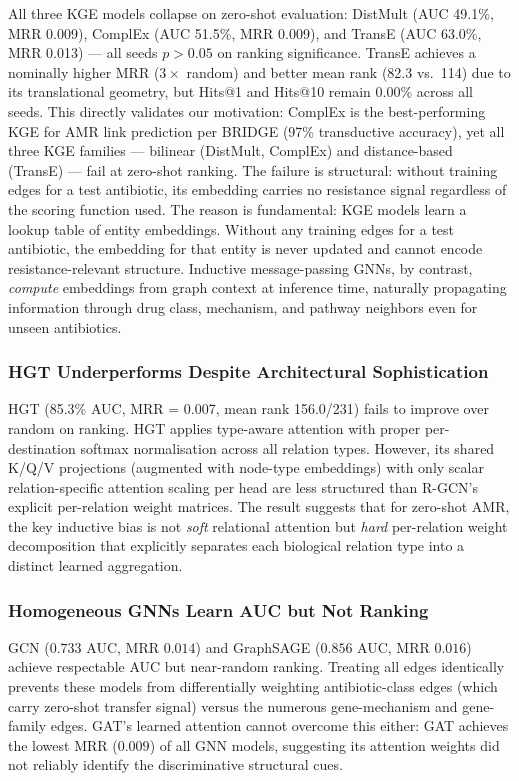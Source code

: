 \documentclass[conference]{IEEEtran}
\begin{document}
All three KGE models collapse on zero-shot evaluation: DistMult (AUC 49.1\%, MRR 0.009), ComplEx (AUC 51.5\%, MRR 0.009), and TransE (AUC 63.0\%, MRR 0.013) --- all seeds $p > 0.05$ on ranking significance. TransE achieves a nominally higher MRR ($3\times$ random) and better mean rank (82.3 vs.\ 114) due to its translational geometry, but Hits@1 and Hits@10 remain 0.00\% across all seeds. This directly validates our motivation: ComplEx is the best-performing KGE for AMR link prediction per BRIDGE \cite{bessadok2026bridge} (97\% transductive accuracy), yet all three KGE families --- bilinear (DistMult, ComplEx) and distance-based (TransE) --- fail at zero-shot ranking. The failure is structural: without training edges for a test antibiotic, its embedding carries no resistance signal regardless of the scoring function used. The reason is fundamental: KGE models learn a lookup table of entity embeddings. Without any training edges for a test antibiotic, the embedding for that entity is never updated and cannot encode resistance-relevant structure. Inductive message-passing GNNs, by contrast, \textit{compute} embeddings from graph context at inference time, naturally propagating information through drug class, mechanism, and pathway neighbors even for unseen antibiotics.

\subsubsection{HGT Underperforms Despite Architectural Sophistication}

HGT (85.3\% AUC, MRR = 0.007, mean rank 156.0/231) fails to improve over random on ranking. HGT applies type-aware attention with proper per-destination softmax normalisation across all relation types. However, its shared K/Q/V projections (augmented with node-type embeddings) with only scalar relation-specific attention scaling per head are less structured than R-GCN's explicit per-relation weight matrices. The result suggests that for zero-shot AMR, the key inductive bias is not \textit{soft} relational attention but \textit{hard} per-relation weight decomposition that explicitly separates each biological relation type into a distinct learned aggregation.

\subsubsection{Homogeneous GNNs Learn AUC but Not Ranking}

GCN ($0.733$ AUC, MRR $0.014$) and GraphSAGE ($0.856$ AUC, MRR $0.016$) achieve respectable AUC but near-random ranking. Treating all edges identically prevents these models from differentially weighting antibiotic-class edges (which carry zero-shot transfer signal) versus the numerous gene-mechanism and gene-family edges. GAT's learned attention cannot overcome this either: GAT achieves the lowest MRR ($0.009$) of all GNN models, suggesting its attention weights did not reliably identify the discriminative structural cues.
\end{document}
